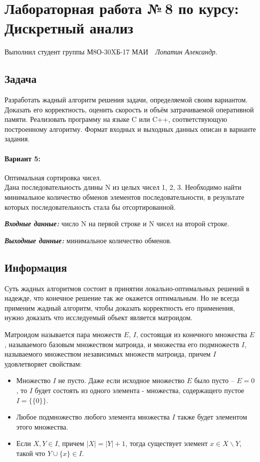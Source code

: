 \documentclass[12pt]{article}
\begin{document}
\section*{\centering Лабораторная работа №\,8 по курсу:\\ Дискретный анализ}

Выполнил студент группы М8О-30XБ-17 МАИ \,\, \textit{Лопатин Александр}.

\subsection*{Задача}

Разработать жадный алгоритм решения задачи, определяемой своим
вариантом. Доказать его корректность, оценить скорость и объём
затрачиваемой оперативной памяти.
Реализовать программу на языке C или C++, соответствующую
построенному алгоритму. Формат входных и выходных данных описан в
варианте задания.


\paragraph*{Вариант 5:} Оптимальная сортировка чисел.\\
Дана последовательность длины N из целых чисел 1, 2, 3. Необходимо
найти минимальное количество обменов элементов последовательности,
в результате которых последовательность стала бы отсортированной.

\textit{\textbf{Входные данные:}} число N на первой строке и N чисел на второй строке.

\textit{ \textbf{Выходные данные:}}  минимальное количество обменов.

\subsection*{Информация}

Суть жадных алгоритмов состоит в принятии локально-оптимальных решений в надежде, что
конечное решение так же окажется оптимальным. Но не всегда применим жадный алгоритм, чтобы
доказать корректность его применения, нужно доказать что исследуемый объект является
матроидом.

Матроидом называется пара множеств $E$, $I$, состоящая из конечного множества $E$, называемого
базовым множеством матроида, и множества его подмножеств $I$, называемого множеством
независимых множеств матроида, причем $I$ удовлетворяет свойствам:
\begin{itemize}
	\item Множество $I$ не пусто. Даже если исходное множество $E$ было пусто -- $E = 0$, то $I$ будет состоять из одного элемента - множества, содержащего пустое $I = \{\{0\}\}$.
	\item Любое подмножество любого элемента множества $I$ также будет элементом этого
	      множества.
	\item Если $X, Y \in I$, причем $|X| = |Y| + 1$, тогда существует элемент
	      $x \in X\backslash Y$, такой что $Y \cup \{x\} \in I$.
\end{itemize}
\end{document}
